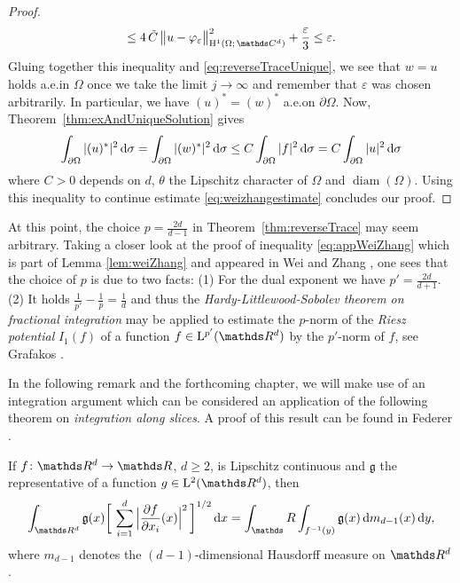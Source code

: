 \begin{proof}
\begin{align*}
    \leq 4 \, \tilde C \, \big\| u - \varphi_\varepsilon \big\|_{\HH^1(\Omega;\, \C^d)}^2 + \frac{\varepsilon}{3} 
    \leq \varepsilon.
  \end{align*}
  Gluing together this inequality and \eqref{eq:reverseTraceUnique}, we see that $w = u$ holds a.e.\@ in $\Omega$ once we take the limit $j \to \infty$ and remember that $\varepsilon$ was chosen arbitrarily.
  In particular, we have $(u)^* = (w)^*$ a.e.\@ on $\partial\Omega$.
  Now, Theorem~\ref{thm:exAndUniqueSolution} gives
  \begin{align*}
    \int_{\partial\Omega} |(u)^*|^2 \, {\operatorname{d}\!{\sigma}} 
    = \int_{\partial\Omega} |(w)^*|^2 \, {\operatorname{d}\!{\sigma}}
    \leq C \int_{\partial\Omega} |f|^2 \, {\operatorname{d}\!{\sigma}} 
    = C \int_{\partial\Omega} |u|^2 \, {\operatorname{d}\!{\sigma}}
  \end{align*}
  where $C> 0$ depends on $d$, $\theta$ the Lipschitz character of $\Omega$ and $\operatorname{diam}(\Omega)$.
  Using this inequality to continue estimate \eqref{eq:weizhangestimate} concludes our proof.
\end{proof}

\begin{rem}
  At this point, the choice $p = \frac{2d}{d - 1}$ in Theorem~\ref{thm:reverseTrace} may seem arbitrary.
  Taking a closer look at the proof of inequality \eqref{eq:appWeiZhang} which is part of Lemma \ref{lem:weiZhang} and appeared in Wei and Zhang \cite[Lem.\@~3.3]{weiZhang}, one sees that the choice of $p$ is due to two facts: (1) For the dual exponent we have $p' = \frac{2d}{d + 1}$. (2) It holds $\frac{1}{p'} - \frac{1}{p} = \frac{1}{d}$ and thus the \emph{Hardy-Littlewood-Sobolev theorem on fractional integration} may be applied to estimate the $p$-norm of the \emph{Riesz potential} $I_1(f)$ of a function $f \in \Ell^{p'}(\R^d)$ by the $p'$-norm of $f$, see Grafakos \cite[Thm.\@~6.1.3]{grafakos2009modern}.
\end{rem}

In the following remark and the forthcoming chapter, we will make use of an integration argument which can be considered an application of the following theorem on \emph{integration along slices}. A proof of this result can be found in Federer \cite[Thm.\@~3.2.12]{federer}.

\begin{thm}
  \label{thm:coarea}
  If $f \colon \R^d \to \R$, $d \geq 2$, is Lipschitz continuous and $\mathfrak{g}$ the representative of a function $g \in \Ell^2(\R^d)$, then
  \begin{align}
    \label{eq:coarea}
    \int_{\R^d} \mathfrak{g}(x) \bigg[ \, \sum_{i = 1}^d \Big|\frac{\partial f}{\partial x_i}(x)\Big|^2 \, \bigg]^{1/2} \d x 
    = \int_\R \int_{f^{-1}(y)} \mathfrak{g}(x) \d m_{d - 1}(x) \d y,
  \end{align}
  where $m_{d - 1}$ denotes the $(d - 1)$-dimensional Hausdorff measure on $\R^d$.
\end{thm}

